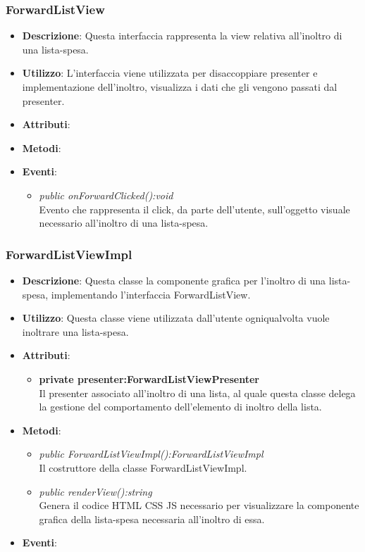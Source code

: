 \subsubsection{ForwardListView}
\begin{itemize}
\item \textbf{Descrizione}: Questa interfaccia rappresenta la view relativa all'inoltro di una lista-spesa.
\item \textbf{Utilizzo}: L'interfaccia viene utilizzata per disaccoppiare presenter e implementazione dell'inoltro, visualizza i dati che gli vengono passati dal presenter.
\item \textbf{Attributi}: 
\item \textbf{Metodi}:
\item \textbf{Eventi}:
\begin{itemize}
\item \textit{public onForwardClicked():void}\\
	Evento che rappresenta il click, da parte dell'utente, sull'oggetto visuale necessario all'inoltro di una lista-spesa.
\end{itemize}
\end{itemize}

\subsubsection{ForwardListViewImpl}
\begin{itemize}
\item \textbf{Descrizione}: Questa classe la componente grafica per l'inoltro di una lista-spesa, implementando l'interfaccia ForwardListView.
\item \textbf{Utilizzo}: Questa classe viene utilizzata dall'utente ogniqualvolta vuole inoltrare una lista-spesa.
\item \textbf{Attributi}:
\begin{itemize}
\item \textbf{private presenter:ForwardListViewPresenter}\\
Il presenter associato all'inoltro di una lista, al quale questa classe delega la gestione del comportamento dell'elemento di inoltro della lista.
\end{itemize}
\item \textbf{Metodi}: 
	\begin{itemize}
	\item \textit{public ForwardListViewImpl():ForwardListViewImpl}\\
	Il costruttore della classe ForwardListViewImpl.
	\item \textit{public renderView():string}\\
		Genera il codice HTML CSS JS necessario per visualizzare la componente grafica della lista-spesa necessaria all'inoltro di essa.
	\end{itemize}
\item \textbf{Eventi}:
\end{itemize}

